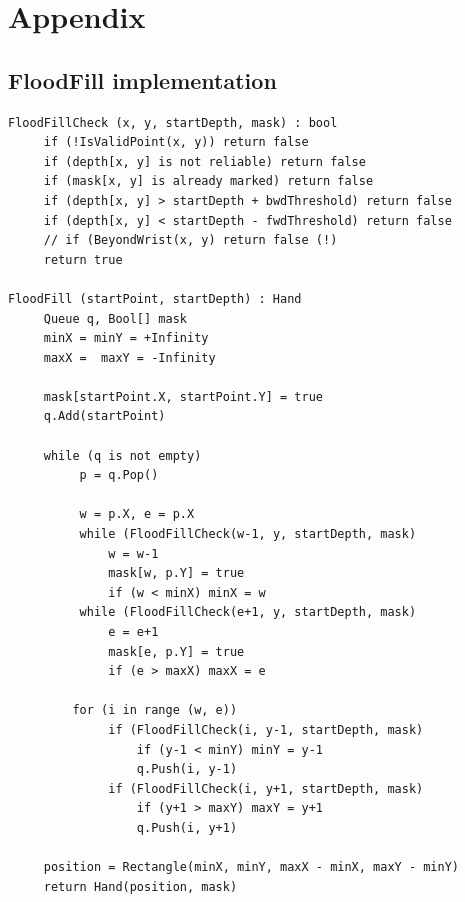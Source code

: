 \documentclass[a4paper,11pt,oneside]{article}
\begin{document}
  \newpage

\section{Appendix}

\subsection{FloodFill implementation}

\begin{verbatim}
FloodFillCheck (x, y, startDepth, mask) : bool
     if (!IsValidPoint(x, y)) return false
     if (depth[x, y] is not reliable) return false
     if (mask[x, y] is already marked) return false
     if (depth[x, y] > startDepth + bwdThreshold) return false
     if (depth[x, y] < startDepth - fwdThreshold) return false
     // if (BeyondWrist(x, y) return false (!)
     return true

FloodFill (startPoint, startDepth) : Hand
     Queue q, Bool[] mask
     minX = minY = +Infinity
     maxX =  maxY = -Infinity

     mask[startPoint.X, startPoint.Y] = true
     q.Add(startPoint)

     while (q is not empty)
          p = q.Pop()

          w = p.X, e = p.X
          while (FloodFillCheck(w-1, y, startDepth, mask)
              w = w-1
              mask[w, p.Y] = true
              if (w < minX) minX = w
          while (FloodFillCheck(e+1, y, startDepth, mask)
              e = e+1
              mask[e, p.Y] = true
              if (e > maxX) maxX = e

         for (i in range (w, e)) 
              if (FloodFillCheck(i, y-1, startDepth, mask)
                  if (y-1 < minY) minY = y-1
                  q.Push(i, y-1)
              if (FloodFillCheck(i, y+1, startDepth, mask)
                  if (y+1 > maxY) maxY = y+1
                  q.Push(i, y+1)
     
     position = Rectangle(minX, minY, maxX - minX, maxY - minY)
     return Hand(position, mask)

\end{verbatim}

  \renewcommand{\refname}{\section{References}}
  
  
  
\end{document}
